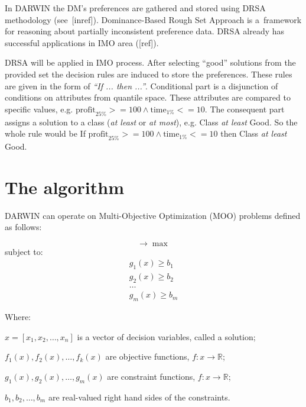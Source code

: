 In DARWIN the DM's preferences are gathered and stored using DRSA methodology
(see~[inref]). Dominance-Based Rough Set Approach is a~framework for reasoning
about partially inconsistent preference data. DRSA already has successful
applications in IMO area ([ref]).

DRSA will be applied in IMO process. After selecting ``good'' solutions from
the provided set the decision rules are induced to store the
preferences. These rules are given in the form of \textit{``If ... then
  ...''}. Conditional part is a disjunction of conditions on attributes from
quantile space. These attributes are compared to specific values, e.g.
$\text{profit}_{25\%} >= 100 \land \text{time}_{1\%} <= 10$. The consequent
part assigns a solution to a class (\textit{at least} or \textit{at most}),
e.g. Class \textit{at least} Good. So the whole rule would be If
$\text{profit}_{25\%} >= 100 \land \text{time}_{1\%} <= 10$ then Class
\textit{at least} Good.

\section{The algorithm}

DARWIN can operate on Multi-Objective Optimization (MOO) problems defined as
follows:

\begin{equation}
[ f_1(x), f_2(x), \dots, f_k(x) ] \rightarrow  \max
\end{equation}
subject to:
\begin{equation}
\begin{array}{l}
g_1(x) \geq b_1 \\
g_2(x) \geq b_2 \\
\dots \\
g_m(x) \geq b_m
\end{array}
\end{equation}

Where:
\begin{description}
\item $x = [x_1, x_2, \dots, x_n]$ is a vector of decision variables, called a
  solution;
\item $f_1(x), f_2(x), \dots, f_k(x)$ are objective functions,
  $f: x \rightarrow \mathbb{R}$;
\item $g_1(x), g_2(x), \dots, g_m(x)$ are constraint functions,
  $f: x \rightarrow \mathbb{R}$;
\item $b_1, b_2, \dots, b_m$ are real-valued right hand sides of the
  constraints.
\end{description}


